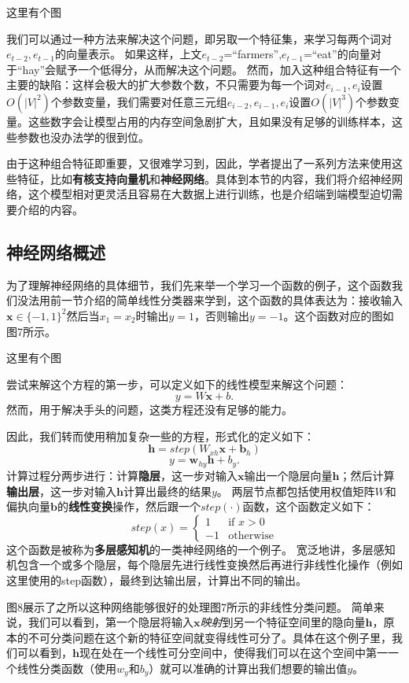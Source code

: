 \documentclass[10pt,a4paper]{ctexart}
\begin{document}
这里有个图

我们可以通过一种方法来解决这个问题，即另取一个特征集，来学习每两个词对$e_{t-2},e_{t-1}$的向量表示。
如果这样，上文$e_{t-2}$=“farmers”,$e_{t-1}$=“eat”的向量对于“hay”会赋予一个低得分，从而解决这个问题。
然而，加入这种组合特征有一个主要的缺陷：这样会极大的扩大参数个数，不只需要为每一个词对$e_{i-1},e_i$设置$O(|V|^2)$个参数变量，我们需要对任意三元组$e_{i-2},e_{i-1},e_i$设置$O(|V|^3)$个参数变量。这些数字会让模型占用的内存空间急剧扩大，且如果没有足够的训练样本，这些参数也没办法学的很到位。

由于这种组合特征即重要，又很难学习到，因此，学者提出了一系列方法来使用这些特征，比如\textbf{有核支持向量机}和\textbf{神经网络}。具体到本节的内容，我们将介绍神经网络，这个模型相对更灵活且容易在大数据上进行训练，也是介绍端到端模型迫切需要介绍的内容。

\subsection{神经网络概述}
为了理解神经网络的具体细节，我们先来举一个学习一个函数的例子，这个函数我们没法用前一节介绍的简单线性分类器来学到，这个函数的具体表达为：接收输入$\textbf{x} \in \{-1,1\}^2$然后当$x_1=x_2$时输出$y=1$，否则输出$y=-1$。这个函数对应的图如图7所示。

这里有个图

尝试来解这个方程的第一步，可以定义如下的线性模型来解这个问题：
\[
 y = W\textbf{x} + b.
\]
然而，用于解决手头的问题，这类方程还没有足够的能力。

因此，我们转而使用稍加复杂一些的方程，形式化的定义如下：
\[
 \textbf{h} = step(W_{xh}\textbf{x} + \textbf{b}_h)
\]
\[
 y = \textbf{w}_{hy}\textbf{h} + b_y.
\]
计算过程分两步进行：计算\textbf{隐层}，这一步对输入$\textbf{x}$输出一个隐层向量$\textbf{h}$；然后计算\textbf{输出层}，这一步对输入$\textbf{h}$计算出最终的结果$y$。
两层节点都包括使用权值矩阵$W$和偏执向量$\textbf{b}$的\textbf{线性变换}操作，然后跟一个$step(\cdot)$函数，这个函数定义如下：
\[
 step(x) = \left\{ \begin{array}{ll}
  1 & \textrm{if $x > 0$} \\
  -1 & \textrm{otherwise}
  \end{array} \right.
\]
这个函数是被称为\textbf{多层感知机}的一类神经网络的一个例子。
宽泛地讲，多层感知机包含一个或多个隐层，每个隐层先进行线性变换然后再进行非线性化操作（例如这里使用的step函数），最终到达输出层，计算出不同的输出。

图8展示了之所以这种网络能够很好的处理图7所示的非线性分类问题。
简单来说，我们可以看到，第一个隐层将输入$\textbf{x}$\textit{映射}到另一个特征空间里的隐向量$\textbf{h}$，原本的不可分类问题在这个新的特征空间就变得线性可分了。具体在这个例子里，我们可以看到，$\textbf{h}$现在处在一个线性可分空间中，使得我们可以在这个空间中第一一个线性分类函数（使用$w_y$和$b_y$）就可以准确的计算出我们想要的输出值$y$。
\end{document}
